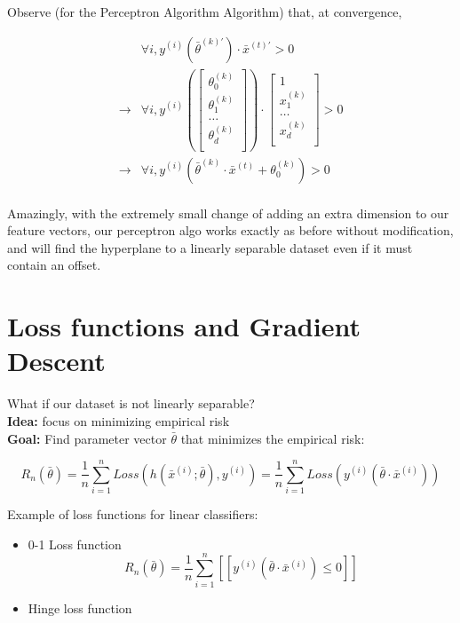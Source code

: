 \documentclass[12pt]{article}
\begin{document}
Observe (for the Perceptron Algorithm Algorithm) that, at convergence, 

\[
	\begin{aligned}
								& \forall i, y^{(i)}(\bar{\theta}^{(k)'}) \cdot \bar{x}^{(t)'} > 0\\
		\rightarrow & \forall i, y^{(i)}
		\left(
			\begin{bmatrix}
				\theta_0^{(k)}\\
				\theta_1^{(k)}\\
				\dots\\
				\theta_d^{(k)}\\
			\end{bmatrix}
		\right)
		\cdot
			\begin{bmatrix}
				1\\
				x_1^{(k)}\\
				\dots\\
				x_d^{(k)}\\
			\end{bmatrix}
		> 0\\
		\rightarrow & \forall i, y^{(i)}(\bar{\theta}^{(k)} \cdot \bar{x}^{(t)} + \theta_0^{(k)}) > 0\\
	\end{aligned}
\] 

Amazingly, with the extremely small change of adding an extra dimension to our feature vectors, our perceptron algo works exactly as before without modification, and will find the hyperplane to a linearly separable dataset even if it must contain an offset. 

\section{Loss functions and Gradient Descent}

What if our dataset is not linearly separable?\\

\textbf{Idea:} focus on minimizing empirical risk\\
\textbf{Goal:} Find parameter vector $\bar{\theta}$ that minimizes the empirical risk:

\[ R_n(\bar{\theta}) = \frac 1 n \sum_{i=1}^n Loss(h(\bar{x}^{(i)};\bar{\theta}), y^{(i)}) = \frac 1 n \sum_{i=1}^n Loss(y^{(i)}(\bar{\theta} \cdot \bar{x}^{(i)})) \]

Example of loss functions for linear classifiers:

\begin{itemize}
	\item 0-1 Loss function
		\[ R_n(\bar{\theta}) = \frac 1 n \sum_{i=1}^n [[y^{(i)}(\bar{\theta} \cdot \bar{x}^{(i)}) \le 0]] \]
	\item Hinge loss function
\end{itemize}
\end{document}
